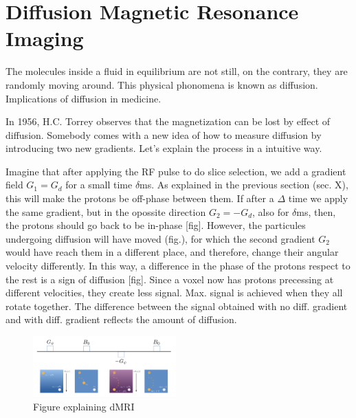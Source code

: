 

\section{Diffusion Magnetic Resonance Imaging}
The molecules inside a fluid in equilibrium are not still, on the contrary, they are randomly moving around.
This physical phonomena is known as diffusion.
Implications of diffusion in medicine.

In 1956, H.C. Torrey \cite{Torrey1956} observes that the magnetization can be lost by effect of diffusion.
Somebody comes with a new idea of how to measure diffusion by introducing two new gradients.
Let's explain the process in a intuitive way.

Imagine that after applying the RF pulse to do slice selection, we add a gradient field $G_1=G_d$ for a small time $\delta$ms.
As explained in the previous section (sec. X), this will make the protons be off-phase between them.
If after a $\Delta$ time we apply the same gradient, but in the opossite direction $G_2=-G_d$, also for $\delta$ms, then, the protons should go back to be in-phase [fig].
However, the particules undergoing diffusion will have moved (fig.), for which the second gradient $G_2$ would have reach them in a different place, and therefore, change their angular velocity differently.
In this way, a difference in the phase of the protons respect to the rest is a sign of diffusion [fig].
Since a voxel now has protons precessing at different velocities, they create less signal.
Max. signal is achieved when they all rotate together.
The difference between the signal obtained with no diff. gradient and with diff. gradient reflects the amount of diffusion.


\begin{figure}
    \includegraphics[width=0.49\textwidth]{3.mri/img/dmri.png}
    \caption{Figure explaining dMRI}
    \label{fig:}
\end{figure}  

